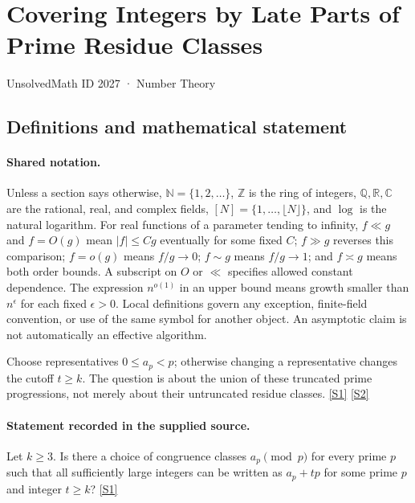 \documentclass[11pt,a4paper]{article}
\newcommand{\N}{\mathbb{N}}
\newcommand{\Z}{\mathbb{Z}}
\newcommand{\Q}{\mathbb{Q}}
\newcommand{\R}{\mathbb{R}}
\newcommand{\C}{\mathbb{C}}
\newcommand{\sref}[2]{\hyperlink{source:#1:#2}{[S#2]}}
\begin{document}

\setcounter{section}{2026}

\section{Covering Integers by Late Parts of Prime Residue Classes}\label{2027}

{\small\sffamily UnsolvedMath ID 2027 · Number Theory}

\subsection{Definitions and mathematical statement}

\paragraph{Shared notation.}Unless a section says otherwise, $\N=\{1,2,\ldots\}$,
$\Z$ is the ring of integers, $\Q,\R,\C$ are the rational, real, and complex
fields, $[N]=\{1,\ldots,\lfloor N\rfloor\}$, and $\log$ is the natural
logarithm. For real functions of a parameter tending to infinity,
$f\ll g$ and $f=O(g)$ mean $|f|\leq Cg$ eventually for some fixed $C$;
$f\gg g$ reverses this comparison; $f=o(g)$ means $f/g\to0$;
$f\sim g$ means $f/g\to1$; and $f\asymp g$ means both order bounds.
A subscript on $O$ or $\ll$ specifies allowed constant dependence.
The expression $n^{o(1)}$ in an upper bound means growth smaller than
$n^\epsilon$ for each fixed $\epsilon>0$. Local definitions govern any
exception, finite-field convention, or use of the same symbol for another
object. An asymptotic claim is not automatically an effective algorithm.



Choose representatives $0\leq a_p<p$; otherwise changing a representative changes the cutoff $t\geq k$. The question is about the union of these truncated prime progressions, not merely about their untruncated residue classes. \sref{2027}{1} \sref{2027}{2}

\paragraph{Statement recorded in the supplied source.}
Let $k\geq 3$. Is there a choice of congruence classes $a_p\pmod{p}$ for every prime $p$ such that all sufficiently large integers can be written as $a_p+tp$ for some prime $p$ and integer $t\geq k$? \sref{2027}{1}
\end{document}

